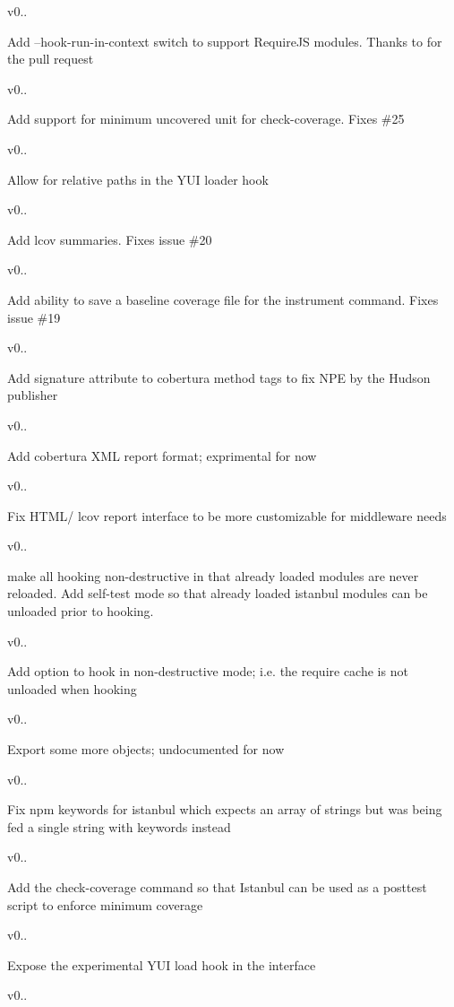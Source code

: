 v0..

Add --hook-\/run-\/in-\/context switch to support Require\+J\+S modules. Thanks to  for the pull request 

v0..

Add support for minimum uncovered unit for check-\/coverage. Fixes \#25 

v0..

Allow for relative paths in the Y\+U\+I loader hook 

v0..

Add lcov summaries. Fixes issue \#20 

v0..

Add ability to save a baseline coverage file for the instrument command. Fixes issue \#19 

v0..

Add signature attribute to cobertura method tags to fix N\+P\+E by the Hudson publisher 

v0..

Add cobertura X\+M\+L report format; exprimental for now 

v0..

Fix H\+T\+M\+L/ lcov report interface to be more customizable for middleware needs 

v0..

make all hooking non-\/destructive in that already loaded modules are never reloaded. Add self-\/test mode so that already loaded istanbul modules can be unloaded prior to hooking. 

v0..

Add option to hook in non-\/destructive mode; i.\+e. the require cache is not unloaded when hooking 

v0..

Export some more objects; undocumented for now 

v0..

Fix npm keywords for istanbul which expects an array of strings but was being fed a single string with keywords instead 

v0..

Add the \textquotesingle{}check-\/coverage\textquotesingle{} command so that Istanbul can be used as a posttest script to enforce minimum coverage 

v0..

Expose the experimental Y\+U\+I load hook in the interface 

v0..

